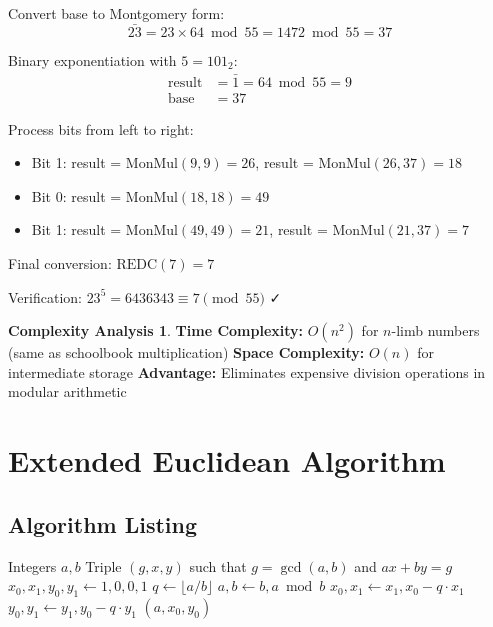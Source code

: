 \documentclass[12pt,a4paper]{article}
\theoremstyle{definition}
\newtheorem{complexity}{Complexity Analysis}[section]
\begin{document}
Convert base to Montgomery form:
\[\bar{23} = 23 \times 64 \bmod 55 = 1472 \bmod 55 = 37\]

Binary exponentiation with $5 = 101_2$:
\begin{align}
\text{result} &= \bar{1} = 64 \bmod 55 = 9\\
\text{base} &= 37
\end{align}

Process bits from left to right:
\begin{itemize}
    \item Bit 1: result = $\text{MonMul}(9, 9) = 26$, result = $\text{MonMul}(26, 37) = 18$
    \item Bit 0: result = $\text{MonMul}(18, 18) = 49$
    \item Bit 1: result = $\text{MonMul}(49, 49) = 21$, result = $\text{MonMul}(21, 37) = 7$
\end{itemize}

Final conversion: $\text{REDC}(7) = 7$

Verification: $23^5 = 6436343 \equiv 7 \pmod{55}$ ✓

\begin{complexity}
\textbf{Time Complexity:} $O(n^2)$ for $n$-limb numbers (same as schoolbook multiplication)
\textbf{Space Complexity:} $O(n)$ for intermediate storage
\textbf{Advantage:} Eliminates expensive division operations in modular arithmetic
\end{complexity}

\section{Extended Euclidean Algorithm}

\subsection{Algorithm Listing}

\begin{algorithm}[H]
\caption{Extended Euclidean Algorithm}
\label{alg:extended-gcd}
\begin{algorithmic}[1]
\REQUIRE Integers $a, b$
\ENSURE Triple $(g, x, y)$ such that $g = \gcd(a,b)$ and $ax + by = g$
\STATE $x_0, x_1, y_0, y_1 \leftarrow 1, 0, 0, 1$
    \STATE $q \leftarrow \lfloor a/b \rfloor$
    \STATE $a, b \leftarrow b, a \bmod b$
    \STATE $x_0, x_1 \leftarrow x_1, x_0 - q \cdot x_1$
    \STATE $y_0, y_1 \leftarrow y_1, y_0 - q \cdot y_1$
\ENDWHILE
\RETURN $(a, x_0, y_0)$
\end{algorithmic}
\end{algorithm}
\end{document}
